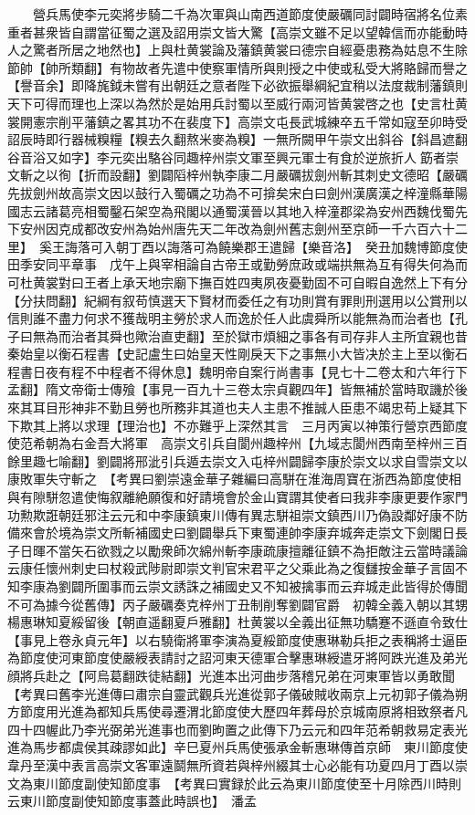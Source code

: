 　　營兵馬使李元奕將步騎二千為次軍與山南西道節度使嚴礪同討闢時宿將名位素重者甚衆皆自謂當征蜀之選及詔用崇文皆大驚【高崇文雖不足以望韓信而亦能動時人之驚者所居之地然也】上與杜黄裳論及藩鎮黄裳曰德宗自經憂患務為姑息不生除節帥【帥所類翻】有物故者先遣中使察軍情所與則授之中使或私受大將賂歸而譽之【譽音余】即降旄鉞未嘗有出朝廷之意者陛下必欲振舉綱紀宜稍以法度裁制藩鎮則天下可得而理也上深以為然於是始用兵討蜀以至威行兩河皆黄裳啓之也【史言杜黄裳開憲宗削平藩鎮之畧其功不在裴度下】高崇文屯長武城練卒五千常如寇至卯時受詔辰時即行器械糗糧【糗去久翻熬米麥為糗】一無所闕甲午崇文出斜谷【斜昌遮翻谷音浴又如字】李元奕出駱谷同趣梓州崇文軍至興元軍士有食於逆旅折人筯者崇文斬之以徇【折而設翻】劉闢䧟梓州執李康二月嚴礪拔劍州斬其刺史文德昭【嚴礪先拔劍州故高崇文因以鼓行入蜀礪之功為不可揜矣宋白曰劍州漢廣漢之梓潼縣華陽國志云諸葛亮相蜀鑿石架空為飛閣以通蜀漢晉以其地入梓潼郡梁為安州西魏伐蜀先下安州因克成都改安州為始州唐先天二年改為劍州舊志劍州至京師一千六百六十二里】　奚王誨落可入朝丁酉以誨落可為饒樂郡王遣歸【樂音洛】　癸丑加魏博節度使田季安同平章事　戊午上與宰相論自古帝王或勤勞庶政或端拱無為互有得失何為而可杜黄裳對曰王者上承天地宗廟下撫百姓四夷夙夜憂勤固不可自暇自逸然上下有分【分扶問翻】紀綱有叙苟慎選天下賢材而委任之有功則賞有罪則刑選用以公賞刑以信則誰不盡力何求不獲哉明主勞於求人而逸於任人此虞舜所以能無為而治者也【孔子曰無為而治者其舜也歟治直吏翻】至於獄市煩細之事各有司存非人主所宜親也昔秦始皇以衡石程書【史記盧生曰始皇天性剛戾天下之事無小大皆决於主上至以衡石程書日夜有程不中程者不得休息】魏明帝自案行尚書事【見七十二卷太和六年行下孟翻】隋文帝衛士傳飱【事見一百九十三卷太宗貞觀四年】皆無補於當時取譏於後來其耳目形神非不勤且勞也所務非其道也夫人主患不推誠人臣患不竭忠苟上疑其下下欺其上將以求理【理治也】不亦難乎上深然其言　三月丙寅以神策行營京西節度使范希朝為右金吾大將軍　高崇文引兵自閬州趣梓州【九域志閬州西南至梓州三百餘里趣七喻翻】劉闢將邢泚引兵遁去崇文入屯梓州闢歸李康於崇文以求自雪崇文以康敗軍失守斬之　【考異曰劉崇遠金華子雜編曰高駢在淮海周寶在浙西為節度使相與有隙駢忽遣使悔叙離絶願復和好請境會於金山寶謂其使者曰我非李康更要作家門功勲欺誑朝廷邪注云元和中李康鎮東川傳有異志駢祖崇文鎮西川乃偽設鄰好康不防備來會於境為崇文所斬補國史曰劉闢舉兵下東蜀連帥李康弃城奔走崇文下劍閣日長子日暉不當矢石欲戮之以勵衆師次綿州斬李康疏康擅離征鎮不為拒敵注云當時議論云康任懷州刺史曰杖殺武陟尉即崇文判官宋君平之父乘此為之復讎按金華子言固不知李康為劉闢所圍事而云崇文誘誅之補國史又不知被擒事而云弃城走此皆得於傳聞不可為據今從舊傳】丙子嚴礪奏克梓州丁丑制削奪劉闢官爵　初韓全義入朝以其甥楊惠琳知夏綏留後【朝直遥翻夏戶雅翻】杜黄裳以全義出征無功驕蹇不遜直令致仕【事見上卷永貞元年】以右驍衛將軍李演為夏綏節度使惠琳勒兵拒之表稱將士逼臣為節度使河東節度使嚴綬表請討之詔河東天德軍合擊惠琳綬遣牙將阿跌光進及弟光顔將兵赴之【阿烏葛翻跌徒結翻】光進本出河曲步落稽兄弟在河東軍皆以勇敢聞　【考異曰舊李光進傳曰肅宗自靈武觀兵光進從郭子儀破賊收兩京上元初郭子儀為朔方節度用光進為都知兵馬使尋遷渭北節度使大歷四年葬母於京城南原將相致祭者凡四十四幄此乃李光弼弟光進事也而劉昫置之此傳下乃云元和四年范希朝救易定表光進為馬步都虞侯其疎謬如此】辛巳夏州兵馬使張承金斬惠琳傳首京師　東川節度使韋丹至漢中表言高崇文客軍遠鬬無所資若與梓州綴其士心必能有功夏四月丁酉以崇文為東川節度副使知節度事　【考異曰實録於此云為東川節度使至十月除西川時則云東川節度副使知節度事蓋此時誤也】　潘孟